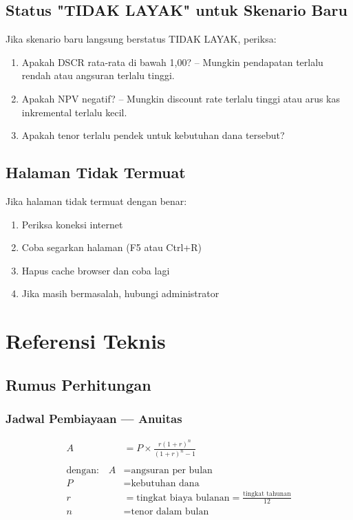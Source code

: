 \documentclass[12pt,a4paper,twoside]{report}
\begin{document}
\section{Status "TIDAK LAYAK" untuk Skenario Baru}

Jika skenario baru langsung berstatus TIDAK LAYAK, periksa:
\begin{enumerate}
  \item Apakah DSCR rata-rata di bawah 1,00? -- Mungkin pendapatan terlalu rendah atau angsuran terlalu tinggi.
  \item Apakah NPV negatif? -- Mungkin discount rate terlalu tinggi atau arus kas inkremental terlalu kecil.
  \item Apakah tenor terlalu pendek untuk kebutuhan dana tersebut?
\end{enumerate}

\section{Halaman Tidak Termuat}

Jika halaman tidak termuat dengan benar:
\begin{enumerate}
  \item Periksa koneksi internet
  \item Coba segarkan halaman (F5 atau Ctrl+R)
  \item Hapus cache browser dan coba lagi
  \item Jika masih bermasalah, hubungi administrator
\end{enumerate}

\chapter{Referensi Teknis}

\section{Rumus Perhitungan}

\subsection{Jadwal Pembiayaan --- Anuitas}

\begin{align*}
  A &= P \times \frac{r(1+r)^n}{(1+r)^n - 1} \\
 \\
 \text{dengan:}\quad A &= \text{angsuran per bulan} \\
 P &= \text{kebutuhan dana} \\
 r &= \text{tingkat biaya bulanan} = \frac{\text{tingkat tahunan}}{12} \\
 n &= \text{tenor dalam bulan}
\end{align*}
\end{document}
